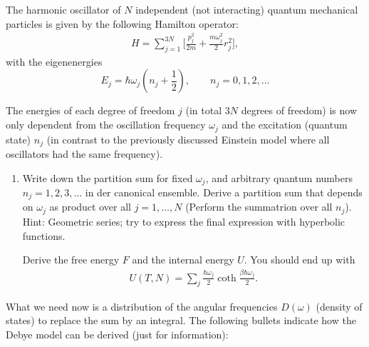 \documentclass[12pt,a4paper]{article} %
\begin{document}
The harmonic oscillator of $N$ independent (not interacting) quantum mechanical particles is given by the following Hamilton operator:
\begin{align*}
 H = \sum_{j = 1}^{3 N} \Big[ \frac{p_j^2}{2m} + \frac{m \omega_j^2}{2} r_j^2\Big],
\end{align*} with the eigenenergies
$$E_j = \hbar \omega_j (n_j  + \frac{1}{2})  , \qquad n_{j} = 0,1,2,\dots 
$$

The energies of each degree of freedom $j$ (in total $3N$ degrees of freedom) is now only dependent from the oscillation frequency  $\omega_j$ and the excitation (quantum state) $n_j$ (in contrast to the previously discussed Einstein model where all oscillators had the same frequency).

\begin{enumerate}
  \item Write down the partition sum for fixed $\omega_j$, and arbitrary quantum numbers $n_j = 1,2,3,\dots$ in der canonical ensemble.
  Derive a partition sum that depends on $\omega_j$ as product over all $j = 1, \dots, N$ (Perform the summatrion over all $n_j$).\\
  Hint: Geometric series; try to express the final expression with hyperbolic functions.
  
  Derive the free energy $F$ and the internal energy $U$. You should end up with 
\begin{align}
U(T,N) = \sum_j \frac{\hbar \omega_j}{2} \coth{\frac{\beta \hbar \omega_j}{2}}. \label{equ:internal_energy} 
\end{align}

  
  \end{enumerate}
  What we need now is a distribution of the angular frequencies $D(\omega)$ (density of states) to replace the sum by an integral.
  The following bullets indicate how the Debye model can be derived (just for information):
 
\end{document}
